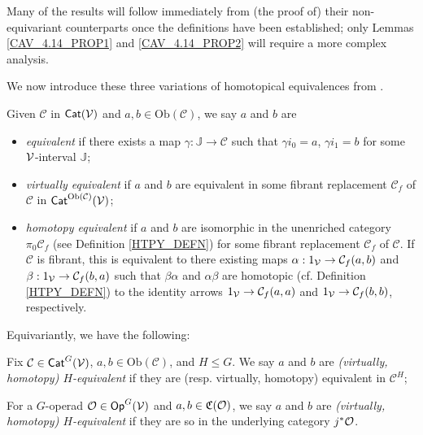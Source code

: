 \documentclass[a4paper,10pt
,draft
]{article}%
\newcommand{\J}{\mathbb J}
\renewcommand{\1}{\eta}%
\begin{document}
Many of the results will follow immediately from (the proof of) their non-equivariant counterparts once the definitions have been established; 
only Lemmas \ref{CAV_4.14_PROP1} and \ref{CAV_4.14_PROP2} will require a more complex analysis.

We now introduce these three variations of homotopical equivalences from \cite{Cav, BM13}.
\begin{definition}
      \label{EQUIV_DEF}
      Given $\mathcal{C}$ in  $\mathsf{Cat}(\mathcal V)$ and $a,b\in\mathrm{Ob}(\mathcal C)$, we say $a$ and $b$ are
      \begin{itemize}
      \item {\em equivalent} if there exists a map $\gamma: \J \to \mathcal C$ such that
            $\gamma i_0 = a$, $\gamma i_1 = b$
            for some $\mathcal V$-interval $\J$;
      \item {\em virtually equivalent} if $a$ and $b$ are equivalent in some fibrant replacement
            $\mathcal C_f$ of $\mathcal C$ in $\mathsf{Cat}^{\mathrm{Ob}(\mathcal C)}(\mathcal V)$;
      \item {\em homotopy equivalent} if $a$ and $b$ are isomorphic in the unenriched category $\pi_0 \mathcal C_f$ (see Definition \ref{HTPY_DEFN})
            for some fibrant replacement $\mathcal C_f$ of $\mathcal C$.
            If $\mathcal C$ is fibrant, this is equivalent to 
            there existing maps
            $\alpha: 1_{\mathcal V} \to \mathcal C_f(a,b)$ and $\beta: 1_{\mathcal V}\to \mathcal C_f(b,a)$ such that
            $\beta\alpha$ and $\alpha\beta$ are homotopic (cf. Definition \ref{HTPY_DEFN})
            to the identity arrows
            $1_{\mathcal V} \to \mathcal C_f(a,a)$ and $1_{\mathcal V} \to \mathcal C_f(b,b)$, respectively.
      \end{itemize}
\end{definition}

Equivariantly, we have the following:
\begin{definition}
      \label{EQUIVG_DEF}
      Fix $\mathcal{C}\in \mathsf{Cat}^G(\mathcal V)$, $a,b\in \mathrm{Ob}(\mathcal{C})$, and $H \leq G$.
      We say $a$ and $b$ are 
      \textit{(virtually, homotopy) $H$-equivalent}
      if they are (resp. virtually, homotopy) equivalent in $\mathcal{C}^H$;
      
      For a $G$-operad $\mathcal{O}\in \mathsf{Op}^G(\mathcal V)$ and $a,b\in \mathfrak C(\mathcal{O})$, we say $a$ and $b$ are
      {\em (virtually, homotopy) $H$-equivalent}
      if they are so in the underlying category $j^*\mathcal{O}$. 
\end{definition}
\end{document}
